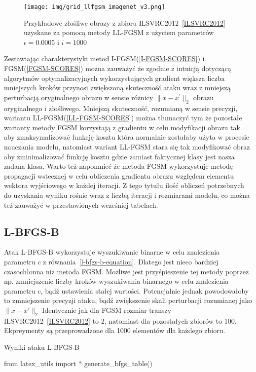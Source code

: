 \documentclass[
    left=2.5cm,         %
    right=2.5cm,        %
    top=2.5cm,          %
    bottom=3cm,         %
    bindingoffset=6mm,  %
    nohyphenation=false %
]{eiti/eiti-thesis}
\begin{document}
\pagebreak

\begin{figure}[H]
        \texttt{[image: img/grid\_llfgsm\_imagenet\_v3.png]}
        \caption{Przykładowe złośliwe obrazy z zbioru ILSVRC2012~\ref{ILSVRC2012} uzyskane za pomocą metody LL-FGSM z użyciem parametrów \(\epsilon=0.0005\) i \(i=1000\)}
        \label{fig:imagenet_grid_llfgsm}
\end{figure}

Zestawiając charakterystyki metod I-FGSM(\ref{I-FGSM-SCORES}) i FGSM(\ref{FGSM-SCORES}) można zauważyć że zgodnie z intuicją dotyczącą
algorytmów optymalizacyjnych wykorzystujących gradient większa liczba mniejszych kroków przynosi zwiększoną skuteczność ataku wraz
z mniejszą perturbacją oryginalnego obrazu w sensie różnicy \(\|x-x^{'}\|_2\) obrazu oryginalnego i złośliwego.
Mniejszą skuteczność, rozumianą w sensie precyzji, wariantu LL-FGSM(\ref{LL-FGSM-SCORES}) można tłumaczyć tym że pozostałe warianty
metody FGSM korzystają z gradientu w celu modyfikacji obrazu tak aby zmaksymalizować funkcję kosztu która normalnie zostałaby użyta w procesie nauczania modelu,
natomiast wariant LL-FGSM stara się tak modyfikować obraz aby zminimalizować funkcję kosztu gdzie zamiast faktycznej klasy jest nasza zadana klasa.
Warto też napomnieć że metoda FGSM wykorzystuje metodę propagacji wstecznej w celu obliczenia gradientu obrazu względem elementu wektora wyjściowego w każdej iteracji.
Z tego tytułu ilość obliczeń potrzebnych do uzyskania wyniku rośnie wraz z liczbą iteracji i rozmiarami modelu, co można też zauważyć w przestawionych wcześniej
tabelach.


\subsection{L-BFGS-B}
Atak L-BFGS-B wykorzystuje wyszukiwanie binarne w celu znalezienia parametru \(c\) z równania~\ref{l-bfgs-b-equation}.
Dlatego jest nieco bardziej czasochłonna niż metoda FGSM. Możliwe jest przyśpieszenie tej metody poprzez np.
zmniejszenie liczby kroków wyszukiwania binarnego w celu znalezienia parametru \(c\), bądź ustawienia stałej wartości.
Potencjalnie jednak powodowałoby to zmniejszenie precyzji ataku, bądź zwiększenie skali perturbacji rozumianej jako
\(\|x-x'\|_2\)
Identycznie jak dla FGSM rozmiar transzy ILSVRC2012~\ref{ILSVRC2012} to 2, natomiast dla pozostałych zbiorów to 100.
Ekpreymenty są przeprowadzone dla 1000 elementów dla każdego zbioru.

\begin{table}[H]
\caption{Wyniki ataku L-BFGS-B}
\begin{adjustbox}{max width=\textwidth}
\begin{pycode}
from latex_utils import *
generate_bfgs_table()
\end{pycode}
\end{adjustbox}
\end{table}
\end{document}
